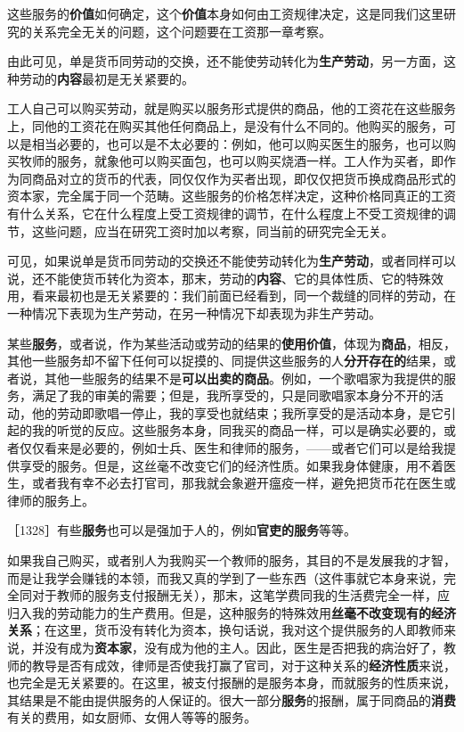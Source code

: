 这些服务的\textbf{价值}如何确定，这个\textbf{价值}本身如何由工资规律决定，这是同我们这里研究的关系完全无关的问题，这个问题要在工资那一章考察。

由此可见，单是货币同劳动的交换，还不能使劳动转化为\textbf{生产劳动}，另一方面，这种劳动的\textbf{内容}最初是无关紧要的。

工人自己可以购买劳动，就是购买以服务形式提供的商品，他的工资花在这些服务上，同他的工资花在购买其他任何商品上，是没有什么不同的。他购买的服务，可以是相当必要的，也可以是不太必要的：例如，他可以购买医生的服务，也可以购买牧师的服务，就象他可以购买面包，也可以购买烧酒一样。工人作为买者，即作为同商品对立的货币的代表，同仅仅作为买者出现，即仅仅把货币换成商品形式的资本家，完全属于同一个范畴。这些服务的价格怎样决定，这种价格同真正的工资有什么关系，它在什么程度上受工资规律的调节，在什么程度上不受工资规律的调节，这些问题，应当在研究工资时加以考察，同当前的研究完全无关。

可见，如果说单是货币同劳动的交换还不能使劳动转化为\textbf{生产劳动}，或者同样可以说，还不能使货币转化为资本，那末，劳动的\textbf{内容}、它的具体性质、它的特殊效用，看来最初也是无关紧要的：我们前面已经看到，同一个裁缝的同样的劳动，在一种情况下表现为生产劳动，在另一种情况下却表现为非生产劳动。

某些\textbf{服务}，或者说，作为某些活动或劳动的结果的\textbf{使用价值}，体现为\textbf{商品}，相反，其他一些服务却不留下任何可以捉摸的、同提供这些服务的人\textbf{分开存在的}结果，或者说，其他一些服务的结果不是\textbf{可以出卖的商品}。例如，一个歌唱家为我提供的服务，满足了我的审美的需要；但是，我所享受的，只是同歌唱家本身分不开的活动，他的劳动即歌唱一停止，我的享受也就结束；我所享受的是活动本身，是它引起的我的听觉的反应。这些服务本身，同我买的商品一样，可以是确实必要的，或者仅仅看来是必要的，例如士兵、医生和律师的服务，——或者它们可以是给我提供享受的服务。但是，这丝毫不改变它们的经济性质。如果我身体健康，用不着医生，或者我有幸不必去打官司，那我就会象避开瘟疫一样，避免把货币花在医生或律师的服务上。

［1328］有些\textbf{服务}也可以是强加于人的，例如\textbf{官吏的服务}等等。

如果我自己购买，或者别人为我购买一个教师的服务，其目的不是发展我的才智，而是让我学会赚钱的本领，而我又真的学到了一些东西（这件事就它本身来说，完全同对于教师的服务支付报酬无关），那末，这笔学费同我的生活费完全一样，应归入我的劳动能力的生产费用。但是，这种服务的特殊效用\textbf{丝毫不改变现有的经济关系}；在这里，货币没有转化为资本，换句话说，我对这个提供服务的人即教师来说，并没有成为\textbf{资本家}，没有成为他的主人。因此，医生是否把我的病治好了，教师的教导是否有成效，律师是否使我打赢了官司，对于这种关系的\textbf{经济性质}来说，也完全是无关紧要的。在这里，被支付报酬的是服务本身，而就服务的性质来说，其结果是不能由提供服务的人保证的。很大一部分\textbf{服务}的报酬，属于同商品的\textbf{消费}有关的费用，如女厨师、女佣人等等的服务。

